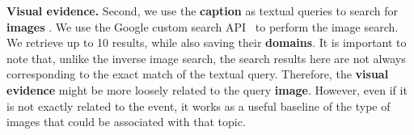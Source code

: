 \textbf{\textcolor{myOrange}{Visual evidence.}} Second, we use the \textbf{\textcolor{myblue}{caption}} as textual queries to search for \textbf{\textcolor{myOrange}{images}} . We use the Google custom search API~\cite{google} to perform the image search. We retrieve up to 10 results, while also saving their \textbf{domains}. It is important to note that, unlike the inverse image search, the search results here are not always corresponding to the exact match of the textual query. Therefore, the \textbf{\textcolor{myOrange}{visual evidence}} might be more loosely related to the query \textbf{\textcolor{myOrange}{image}}. However, even if it is not exactly related to the event, it works as a useful baseline of the type of images that could be associated with that topic. 
